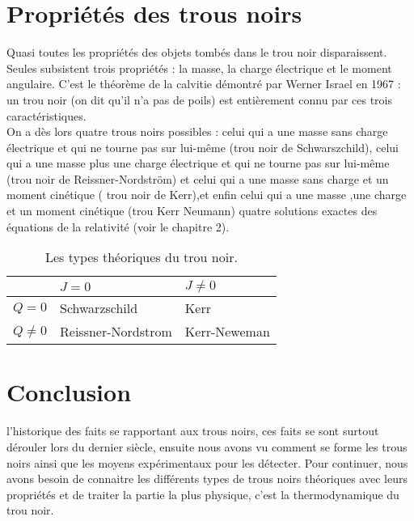 \documentclass[12pt,  a4paper, openright]{report} %
\begin{document}
	\section{Propriétés des trous noirs }
	Quasi toutes les propriétés des objets tombés dans le trou noir disparaissent. Seules subsistent trois propriétés : la masse, la charge électrique et le moment angulaire. C’est le théorème de la calvitie démontré par Werner Israel en 1967 : un trou noir (on dit qu'il n'a pas de poils) est entièrement connu par ces trois caractéristiques.\\
	On a dès lors quatre trous noirs possibles : celui qui a une masse sans charge électrique et qui ne tourne pas sur lui-même (trou noir de Schwarszchild), celui qui a une masse plus une charge électrique et qui ne tourne pas sur lui-même  (trou noir de Reissner-Nordström) et celui qui a une masse sans charge et un moment cinétique ( trou noir de Kerr),et enfin celui qui a une masse ,une charge et un moment cinétique (trou Kerr Neumann) quatre solutions exactes des équations de la relativité (voir le chapitre 2). 
		
		\begin{table}[H]
			\begin{center}
			\centering
		
			{ \renewcommand{\arraystretch}{1.9}
				
				\begin{tabular}{|l|l|l|}
					\hline
					& $J=0$ & $J\neq 0$\\
					\hline
					$Q=0$ & Schwarzschild &  Kerr \\
					
					\hline
					$Q\neq 0$ & Reissner-Nordstrom  & Kerr-Neweman \\
					\hline
					
					\hline
					
			\end{tabular}}
			\end{center}
			\caption{Les types théoriques du trou noir.}
		\end{table}
		
	\section{Conclusion }
	l’historique des faits se rapportant aux trous noirs, ces faits se sont surtout dérouler lors du dernier siècle, ensuite nous avons vu comment se forme les trous noirs ainsi que les moyens expérimentaux pour les détecter. Pour continuer, nous avons besoin de connaitre les différents types de trous noirs théoriques avec leurs propriétés et de traiter  la partie la plus physique, c'est la thermodynamique du trou noir.
	\newpage 	 
	
\end{document}
